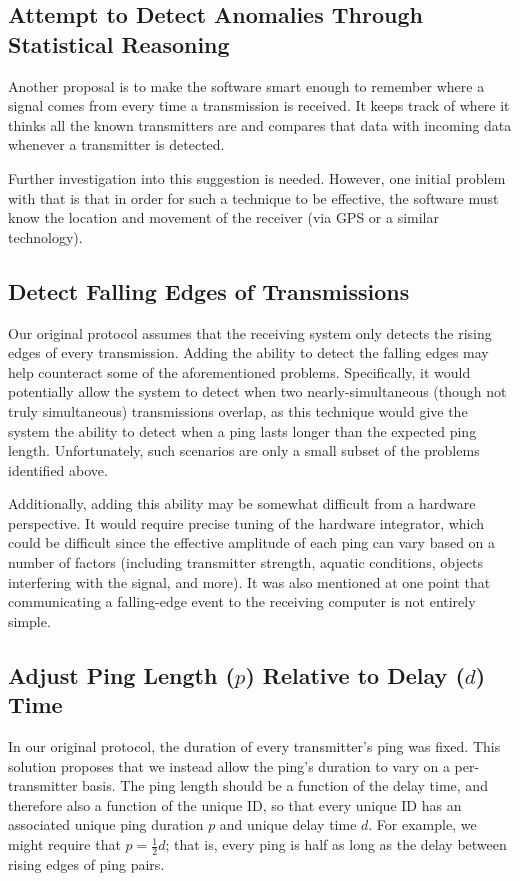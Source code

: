\documentclass[12pt]{article}
\begin{document}
\subsection{Attempt to Detect Anomalies Through Statistical Reasoning}

Another proposal is to make the software smart enough to remember where a
signal comes from every time a transmission is received. It keeps track of
where it thinks all the known transmitters are and compares that data with
incoming data whenever a transmitter is detected.

Further investigation into this suggestion is needed.
However, one initial problem with that is that in order for such a technique
to be effective, the software must know the location and movement of the
receiver (via GPS or a similar technology).

\subsection{Detect Falling Edges of Transmissions}

Our original protocol assumes that the receiving system only detects the rising
edges of every transmission. Adding the ability to detect the falling edges may
help counteract some of the aforementioned problems. Specifically, it would
potentially allow the system to detect when two nearly-simultaneous (though
not truly simultaneous) transmissions overlap, as this technique would give
the system
the ability to detect when a ping lasts longer than the expected ping length.
Unfortunately, such scenarios are only a small subset of the problems identified
above.

Additionally, adding this ability may be somewhat difficult from a hardware
perspective. It would require precise tuning of the hardware integrator, which
could be difficult since the effective amplitude of each ping can vary based on
a number of factors (including transmitter strength, aquatic conditions, objects
interfering with the signal, and more).
It was also mentioned at one point that communicating a falling-edge event to
the receiving computer is not entirely simple.

\subsection{Adjust Ping Length ($p$) Relative to Delay ($d$) Time}

In our original protocol, the duration of every transmitter's ping was fixed.
This solution proposes that we instead allow the ping's duration to vary
on a per-transmitter basis.
The ping length should be a function of the delay time, and therefore also a
function of the unique ID,
so that every unique ID has an associated unique ping duration $p$ and unique
delay time $d$.
For example, we might require that $p=\frac{1}{2}d$; that is, every ping
is half as long as the delay between rising edges of ping pairs.
\end{document}
